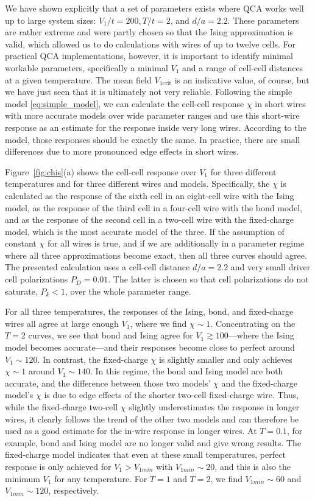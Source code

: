 We have shown explicitly that a set of parameters exists where QCA works well up
to large system sizes: $V_1/t = 200, T/t = 2$, and $d/a = 2.2$. These parameters
are rather extreme and were partly chosen so that the Ising approximation is
valid, which allowed us to do calculations with wires of up to twelve cells. For
practical QCA implementations, however, it is important to identify minimal
workable parameters, specifically a minimal $V_1$ and a range of cell-cell
distances at a given temperature. The mean field $V_{1\textrm{crit}}$ is an indicative
value, of course, but we have just seen that it is ultimately not very reliable.
Following the simple model \eqref{eq:simple_model}, we can calculate the
cell-cell response $\chi$ in short wires with more accurate models over wide
parameter ranges and use this short-wire response as an estimate for the
response inside very long wires. According to the model, those responses should
be exactly the same. In practice, there are small differences due to more
pronounced edge effects in short wires.

Figure~\ref{fig:chis}(a) shows the cell-cell response over $V_1$ for three
different temperatures and for three different wires and models. Specifically,
the $\chi$ is calculated as the response of the sixth cell in an eight-cell wire
with the Ising model, as the response of the third cell in a four-cell wire with
the bond model, and as the response of the second cell in a two-cell wire with
the fixed-charge model, which is the most accurate model of the three. If the
assumption of constant $\chi$ for all wires is true, and if we are additionally
in a parameter regime where all three approximations become exact, then all
three curves should agree. The presented calculation uses a cell-cell distance
$d/a = 2.2$ and very small driver cell polarizations $P_D = 0.01$. The latter is
chosen so that cell polarizations do not saturate, $P_k < 1$, over the whole
parameter range.

For all three temperatures, the responses of the Ising, bond, and fixed-charge
wires all agree at large enough $V_1$, where we find $\chi \sim 1$.
Concentrating on the $T = 2$ curves, we see that bond and Ising agree for $V_1
\gtrsim 100$---where the Ising model becomes accurate---and their responses
become close to perfect around $V_1 \sim 120$. In contrast, the fixed-charge
$\chi$ is slightly smaller and only achieves $\chi \sim 1$ around $V_1 \sim
140$. In this regime, the bond and Ising model are both accurate, and the
difference between those two models' $\chi$ and the fixed-charge model's $\chi$
is due to edge effects of the shorter two-cell fixed-charge wire. Thus, while
the fixed-charge two-cell $\chi$ slightly underestimates the response in longer
wires, it clearly follows the trend of the other two models and can therefore be
used as a good estimate for the in-wire response in longer wires. At $T = 0.1$,
for example, bond and Ising model are no longer valid and give wrong results.
The fixed-charge model indicates that even at these small temperatures, perfect
response is only achieved for $V_1 > V_{1min}$ with $V_{1min} \sim 20$, and this
is also the minimum $V_1$ for any temperature. For $T = 1$ and $T = 2$, we find
$V_{1min} \sim 60$ and $V_{1min} \sim 120$, respectively.

